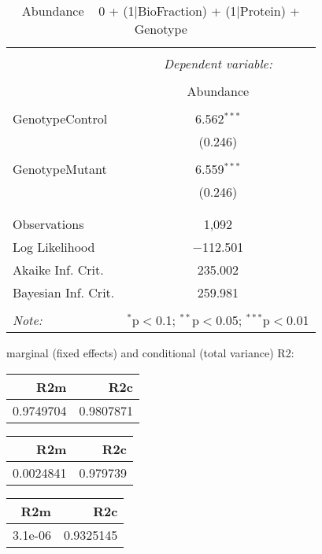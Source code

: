 \documentclass[11pt]{report}
\begin{document}
\begin{table}[!htbp] \centering 
  \caption{Abundance ~ 0 + (1|BioFraction) + (1|Protein) + Genotype} 
  \label{} 
\begin{tabular}{@{\extracolsep{5pt}}lc} 
\\[-1.8ex]\hline 
\hline \\[-1.8ex] 
 & \multicolumn{1}{c}{\textit{Dependent variable:}} \\ 
\cline{2-2} 
\\[-1.8ex] & Abundance \\ 
\hline \\[-1.8ex] 
 GenotypeControl & 6.562$^{***}$ \\ 
  & (0.246) \\ 
  & \\ 
 GenotypeMutant & 6.559$^{***}$ \\ 
  & (0.246) \\ 
  & \\ 
\hline \\[-1.8ex] 
Observations & 1,092 \\ 
Log Likelihood & $-$112.501 \\ 
Akaike Inf. Crit. & 235.002 \\ 
Bayesian Inf. Crit. & 259.981 \\ 
\hline 
\hline \\[-1.8ex] 
\textit{Note:}  & \multicolumn{1}{r}{$^{*}$p$<$0.1; $^{**}$p$<$0.05; $^{***}$p$<$0.01} \\ 
\end{tabular} 
\end{table} 
marginal (fixed effects) and conditional (total variance) R2:

\begin{tabular}{r|r}
\hline
R2m & R2c\\
\hline
0.9749704 & 0.9807871\\
\hline
\end{tabular}

\begin{tabular}{r|r}
\hline
R2m & R2c\\
\hline
0.0024841 & 0.979739\\
\hline
\end{tabular}

\begin{tabular}{r|r}
\hline
R2m & R2c\\
\hline
3.1e-06 & 0.9325145\\
\hline
\end{tabular}
\end{document}
